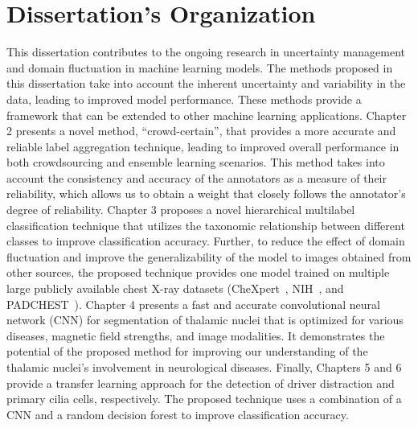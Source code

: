 \section{Dissertation's Organization}
This dissertation contributes to the ongoing research in uncertainty management and domain fluctuation in machine learning models. The methods proposed in this dissertation take into account the inherent uncertainty and variability in the data, leading to improved model performance. These methods provide a framework that can be extended to other machine learning applications. Chapter 2 presents a novel method, ``crowd-certain'', that provides a more accurate and reliable label aggregation technique, leading to improved overall performance in both crowdsourcing and ensemble learning scenarios. This method takes into account the consistency and accuracy of the annotators as a measure of their reliability, which allows us to obtain a weight that closely follows the annotator's degree of reliability. Chapter 3 proposes a novel hierarchical multilabel classification technique that utilizes the taxonomic relationship between different classes to improve classification accuracy. Further, to reduce the effect of domain fluctuation and improve the generalizability of the model to images obtained from other sources, the proposed technique provides one model trained on multiple large publicly available chest X-ray datasets (CheXpert~\cite{irvin_CheXpert_2019}, NIH~\cite{wang_ChestXRay8_2017}, and PADCHEST~\cite{bustos_Padchest_2020}). Chapter 4 presents a fast and accurate convolutional neural network (CNN) for segmentation of thalamic nuclei that is optimized for various diseases, magnetic field strengths, and image modalities. It demonstrates the potential of the proposed method for improving our understanding of the thalamic nuclei's involvement in neurological diseases. Finally, Chapters 5 and 6 provide a transfer learning approach for the detection of driver distraction and primary cilia cells, respectively. The proposed technique uses a combination of a CNN and a random decision forest to improve classification accuracy.
